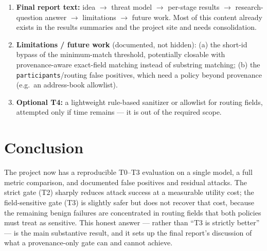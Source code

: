\documentclass[11pt,a4paper]{article}
\begin{document}
\begin{enumerate}
  \item \textbf{Final report text:} idea $\to$ threat model $\to$ per-stage results $\to$
        research-question answer $\to$ limitations $\to$ future work. Most of this content
        already exists in the results summaries and the project site and needs consolidation.
  \item \textbf{Limitations / future work} (documented, not hidden): (a) the short-id bypass of
        the minimum-match threshold, potentially closable with provenance-aware exact-field
        matching instead of substring matching; (b) the \texttt{participants}/routing false
        positives, which need a policy beyond provenance (e.g.\ an address-book allowlist).
  \item \textbf{Optional T4:} a lightweight rule-based sanitizer or allowlist for
        routing fields, attempted only if time remains --- it is out of the required scope.
\end{enumerate}

\section{Conclusion}

The project now has a reproducible T0--T3 evaluation on a single model, a full metric
comparison, and documented false positives and residual attacks. The strict gate (T2) sharply
reduces attack success at a measurable utility cost; the field-sensitive gate (T3) is slightly
safer but does not recover that cost, because the remaining benign failures are concentrated in
routing fields that both policies must treat as sensitive. This honest answer --- rather than
``T3 is strictly better'' --- is the main substantive result, and it sets up the final report's
discussion of what a provenance-only gate can and cannot achieve.
\end{document}
